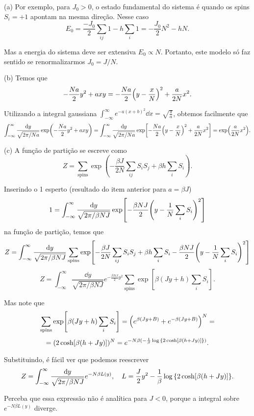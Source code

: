 \documentclass[a4paper,10pt]{article}
\begin{document}
(a) Por exemplo, para $J_0 > 0$, o estado fundamental do sistema é quando os spins $S_i = +1$ apontam na mesma direção. Nesse caso
$$
E_0 = \frac{-J_0}{2} \sum_{ij} 1 - h \sum_{i} 1 = - \frac{J_0}{2} N^2 - h N.
$$

Mas a energia do sistema deve ser extensiva $E_0 \propto N$. Portanto, este modelo só faz sentido se renormalizarmos $J_0 = J/N$.

\n\n

(b) Temos que
$$
-\frac{Na}{2} y^2 + axy = -\frac{Na}{2} \qty(y-\frac{x}{N})^2 + \frac{a}{2N} x^2.
$$

Utilizando a integral gaussiana $\int_{-\infty}^{\infty} e^{-a(x+b)^2} \dd{x} = \sqrt{\frac{\pi}{a}}$, obtemos facilmente que
$$
\int_{-\infty}^{\infty} \frac{\dd{y}}{\sqrt{2\pi/Na}} \exp(-\frac{Na}{2} y^2 + axy) =
\int_{-\infty}^{\infty} \frac{\dd{y}}{\sqrt{2\pi/Na}} \exp[-\frac{Na}{2} \qty(y-\frac{x}{N})^2 + \frac{a}{2N} x^2]
= \exp(\frac{a}{2N} x^2).
$$

\n\n

(c) A função de partição se escreve como
$$
Z = \sum_{\text{spins}} \exp(-\frac{\beta J}{2N} \sum_{ij} S_i S_j + \beta h \sum_{i} S_i).
$$

Inserindo o 1 esperto (resultado do item anterior para $a = \beta J$)
$$
1 = \int_{-\infty}^\infty \frac{\dd{y}}{\sqrt{2 \pi/\beta N J}} \exp[-\frac{\beta NJ}{2} \qty(y - \frac{1}{N} \sum_{i} S_i)^2]
$$
na função de partição, temos que
$$
Z = \int_{-\infty}^\infty \frac{\dd{y}}{\sqrt{2 \pi/\beta N J}}
\sum_{\text{spins}} \exp[-\frac{\beta J}{2N} \sum_{ij} S_i S_j + \beta h \sum_{i} S_i - \frac{\beta NJ}{2} \qty(y - \frac{1}{N} \sum_{i} S_i)^2]
$$
$$
Z = \int_{-\infty}^\infty \frac{\dd{y}}{\sqrt{2 \pi/\beta N J}} e^{-\frac{\beta N J}{2} y^2}
\sum_{\text{spins}} \exp[\beta (Jy + h) \sum_{i} S_i].
$$

Mas note que
$$
\sum_{\text{spins}} \exp[\beta (Jy + h) \sum_{i} S_i] = \qty(e^{\beta(Jy + B)} + e^{-\beta(Jy + B)})^N =
$$
$$
= (2 \cosh[\beta(h+Jy)])^N = e^{-N\beta(-\frac{1}{\beta}\log\qty{2 \cosh[\beta(h+Jy)]})}.
$$

Substituindo, é fácil ver que podemos reescrever
$$
Z = \int_{-\infty}^\infty \frac{\dd{y}}{\sqrt{2 \pi/\beta N J}} e^{-N \beta L(y)}, \quad
L = \frac{J}{2} y^2 - \frac{1}{\beta} \log\qty{2 \cosh[\beta(h+Jy)]}.
$$

Perceba que essa expressão não é analítica para $J < 0$, porque a integral sobre $e^{-N \beta L(y)}$ diverge.

\n\n
\end{document}
